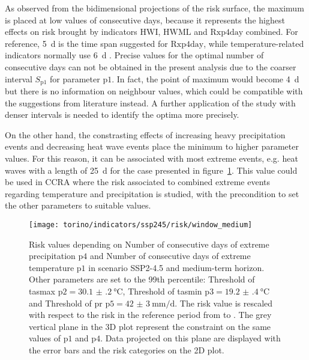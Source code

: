 As observed from the bidimensional projections of the risk surface, the maximum is placed at low values of consecutive days, because it represents the highest effects on risk brought by indicators $\mathrm{HWI}$, $\mathrm{HWML}$ and $\mathrm{Rxp4day}$ combined. For reference, \qty{5}{\day} is the time span suggested for $\mathrm{Rxp4day}$, while temperature-related indicators normally use \qty{6}{\day} \cite[2208]{2021GutierrezAnnexVI}.
Precise values for the optimal number of consecutive days can not be obtained in the present analysis due to the coarser interval $S_\mathrm{p1}$ for parameter $\mathrm{p1}$. In fact, the point of maximum would become \qty{4}{\day} but there is no information on neighbour values, which could be compatible with the suggestions from literature instead. A further application of the study with denser intervals is needed to identify the optima more precisely.

On the other hand, the constrasting effects of increasing heavy precipitation events and decreasing heat wave events place the minimum to higher parameter values. For this reason, it can be associated with most extreme events, e.g. heat waves with a length of \qty{25}{\day} for the case presented in figure~\ref{fig:ssp245_risk_window_medium}.
This value could be used in \gls{CCRA} where the risk associated to combined extreme events regarding temperature and precipitation is studied, with the precondition to set the other parameters to suitable values.

\begin{figure}
  \centering
  \texttt{[image: torino/indicators/ssp245/risk/window\_medium]}
  \caption{Risk values depending on {Number of consecutive days of extreme precipitation} $\mathrm{p4}$ and {Number of consecutive days of extreme temperature} $\mathrm{p1}$ in scenario SSP2-4.5 and medium-term horizon. Other parameters are set to the 99th percentile: {Threshold of \gls{tasmax}} $\mathrm{p2} = \qty{30.1(2)}{\degreeCelsius}$, {Threshold of \gls{tasmin}} $\mathrm{p3} = \qty{19.2(4)}{\degreeCelsius}$ and {Threshold of \gls{pr}} $\mathrm{p5} = \qty{42(3)}{\milli\metre\per\day}$. The risk value is rescaled with respect to the risk in the reference period from  to . The grey vertical plane in the 3D plot represent the constraint on the same values of $\mathrm{p1}$ and $\mathrm{p4}$. Data projected on this plane are displayed with the error bars and the risk categories on the 2D plot.}
  \label{fig:ssp245_risk_window_medium}
\end{figure}

